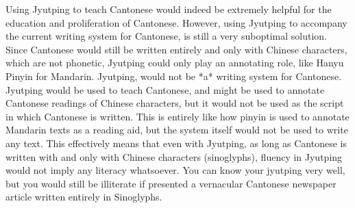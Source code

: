 \documentclass[a5paper, 10pt, openany]{book} %
\begin{document}










Using Jyutping to teach Cantonese would indeed be extremely helpful for the education and proliferation of Cantonese. However, using Jyutping to accompany the current writing system for Cantonese, is still a very suboptimal solution. Since Cantonese would still be written entirely and only with Chinese characters, which are not phonetic, Jyutping could only play an annotating role, like Hanyu Pinyin for Mandarin. Jyutping, would not be *a* writing system for Cantonese. Jyutping would be used to teach Cantonese, and might be used to annotate Cantonese readings of Chinese characters, but it would not be used as the script in which Cantonese is written. This is entirely like how pinyin is used to annotate Mandarin texts as a reading aid, but the system itself would not be used to write any text. This effectively means that even with Jyutping, as long as Cantonese is written with and only with Chinese characters (sinoglyphs), fluency in Jyutping would not imply any literacy whatsoever. You can know your jyutping very well, but you would still be illiterate if presented a vernacular Cantonese newspaper article written entirely in Sinoglyphs.
\end{document}
